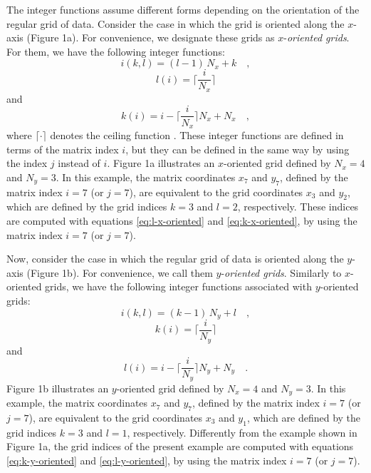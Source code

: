 \documentclass[manuscript,revised]{geophysics}
\begin{document}
The integer functions assume different forms depending on the 
orientation of the regular grid of data.
Consider the case in which the grid is oriented along the
$x$-axis (Figure 1a). For convenience, we designate these grids as 
$x$-\textit{oriented grids}. For them, we have the following integer functions:
\begin{equation}
i(k, l) = (l - 1) \, N_{x} + k \quad ,
\label{eq:i-x-oriented}
\end{equation}
\begin{equation}
l(i) = \Bigg\lceil \frac{i}{N_{x}} \Bigg\rceil
\label{eq:l-x-oriented}
\end{equation}
and
\begin{equation}
k(i)  = i - \Bigg\lceil \frac{i}{N_{x}} \Bigg\rceil N_{x} + N_{x} \quad ,
\label{eq:k-x-oriented}
\end{equation}
where $\lceil \cdot \rceil$ denotes the ceiling function \citep[][ p. 67]{graham-etal1994}.
These integer functions are defined in terms of the matrix index $i$, but they can 
be defined in the same way by using the index $j$ instead of $i$.
Figure 1a illustrates an $x$-oriented grid defined by $N_{x} = 4$ and $N_{y} = 3$.
In this example, the matrix coordinates $x_{7}$ and $y_{7}$, defined by the matrix index $i = 7$ (or $j = 7$), 
are equivalent to the grid coordinates $x_{3}$ and $y_{2}$, which are defined by the grid indices
$k = 3$ and $l = 2$, respectively. These indices are computed with equations \ref{eq:l-x-oriented}
and \ref{eq:k-x-oriented}, by using the matrix index $i = 7$ (or $j = 7$).

Now, consider the case in which the regular grid of data is oriented along 
the $y$-axis (Figure 1b). For convenience, we call them $y$-\textit{oriented grids}.
Similarly to $x$-oriented grids, we have the following integer functions associated with
$y$-oriented grids:
\begin{equation}
i(k, l) = (k - 1) \, N_{y} + l \quad ,
\label{eq:i-y-oriented}
\end{equation}
\begin{equation}
k(i) = \Bigg\lceil \frac{i}{N_{y}} \Bigg\rceil
\label{eq:k-y-oriented}
\end{equation}
and
\begin{equation}
l(i) = i - \Bigg\lceil \frac{i}{N_{y}} \Bigg\rceil N_{y} + N_{y} \quad .
\label{eq:l-y-oriented}
\end{equation}
Figure 1b illustrates an $y$-oriented grid defined by $N_{x} = 4$ and $N_{y} = 3$.
In this example, the matrix coordinates $x_{7}$ and $y_{7}$, defined by the matrix index 
$i = 7$ (or $j = 7$), are equivalent to the grid coordinates $x_{3}$ and $y_{1}$, which are 
defined by the grid indices $k = 3$ and $l = 1$, respectively. Differently from the example
shown in Figure 1a, the grid indices of the present example are 
computed with equations \ref{eq:k-y-oriented} and \ref{eq:l-y-oriented}, by using the 
matrix index $i = 7$ (or $j = 7$).
\end{document}
